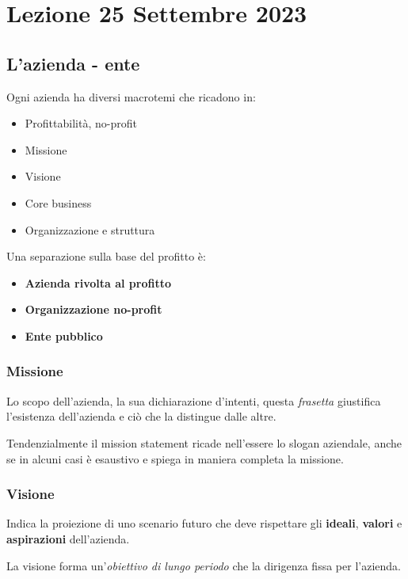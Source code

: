 

\chapter{Lezione 25 Settembre 2023}

\section{L'azienda - ente}




Ogni azienda ha diversi macrotemi che ricadono in:
\begin{itemize}
  \item Profittabilità, no-profit
  \item Missione
  \item Visione
  \item Core business
  \item Organizzazione e struttura
\end{itemize}


Una separazione sulla base del profitto è:
\begin{itemize}
  \item \textbf{Azienda rivolta al profitto}
  \item \textbf{Organizzazione no-profit}
  \item \textbf{Ente pubblico}
\end{itemize}



\subsection{Missione}
Lo scopo dell'azienda, la sua dichiarazione d'intenti, questa \textit{frasetta} giustifica
l'esistenza dell'azienda e ci\`o che la distingue dalle altre.

Tendenzialmente il mission statement ricade nell'essere lo slogan aziendale,
anche se in alcuni casi è esaustivo e spiega in maniera completa la missione.


\subsection{Visione}

Indica la proiezione di uno scenario futuro che deve rispettare gli \textbf{ideali},
\textbf{valori} e \textbf{aspirazioni} dell'azienda.

La visione forma un'\textit{obiettivo di lungo periodo} che la dirigenza fissa per l'azienda.


